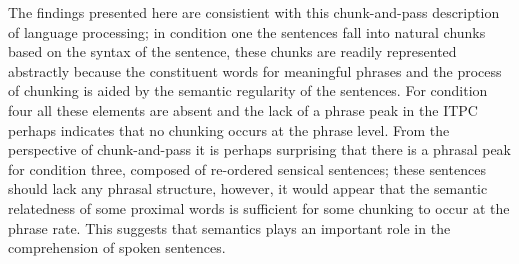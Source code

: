 \documentclass[10pt,letterpaper]{article}
\begin{document}
The findings presented here are consistient with this chunk-and-pass
description of language processing; in condition one the sentences
fall into natural chunks based on the syntax of the sentence, these
chunks are readily represented abstractly because the constituent
words for meaningful phrases and the process of chunking is aided by
the semantic regularity of the sentences. For condition four all these
elements are absent and the lack of a phrase peak in the ITPC perhaps
indicates that no chunking occurs at the phrase level. From the
perspective of chunk-and-pass it is perhaps surprising that there is a
phrasal peak for condition three, composed of re-ordered sensical
sentences; these sentences should lack any phrasal structure, however,
it would appear that the semantic relatedness of some proximal words
is sufficient for some chunking to occur at the phrase rate. This
suggests that semantics plays an important role in the comprehension of
spoken sentences.

\end{document}
